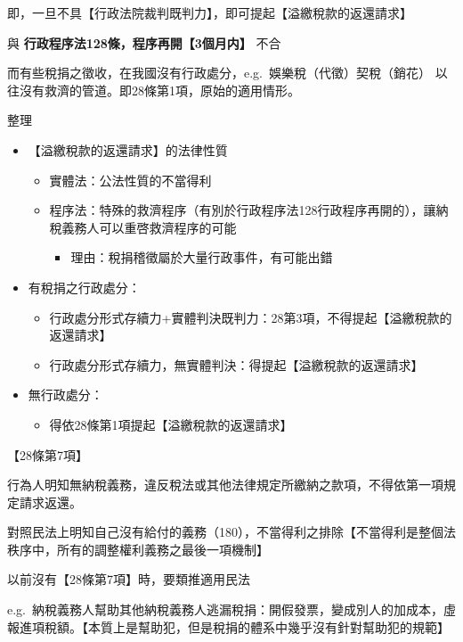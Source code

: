 \documentclass[]{ctexbook}
\providecommand{\tightlist}{%
  \setlength{\itemsep}{0pt}\setlength{\parskip}{0pt}}
\begin{document}
即，一旦不具【行政法院裁判既判力】，即可提起【溢繳稅款的返還請求】

與 \textbf{行政程序法128條，程序再開【3個月内】} 不合

而有些稅捐之徵收，在我國沒有行政處分，e.g.~娛樂稅（代徵）契稅（銷花）
以往沒有救濟的管道。即28條第1項，原始的適用情形。

整理

\begin{itemize}
\tightlist
\item
  【溢繳稅款的返還請求】的法律性質

  \begin{itemize}
  \tightlist
  \item
    實體法：公法性質的不當得利
  \item
    程序法：特殊的救濟程序（有別於行政程序法128行政程序再開的），讓納稅義務人可以重啓救濟程序的可能

    \begin{itemize}
    \tightlist
    \item
      理由：稅捐稽徵屬於大量行政事件，有可能出錯
    \end{itemize}
  \end{itemize}
\item
  有稅捐之行政處分：

  \begin{itemize}
  \tightlist
  \item
    行政處分形式存續力+實體判決既判力：28第3項，不得提起【溢繳稅款的返還請求】
  \item
    行政處分形式存續力，無實體判決：得提起【溢繳稅款的返還請求】
  \end{itemize}
\item
  無行政處分：

  \begin{itemize}
  \tightlist
  \item
    得依28條第1項提起【溢繳稅款的返還請求】
  \end{itemize}
\end{itemize}

【28條第7項】

行為人明知無納稅義務，違反稅法或其他法律規定所繳納之款項，不得依第一項規定請求返還。

對照民法上明知自己沒有給付的義務（180），不當得利之排除【不當得利是整個法秩序中，所有的調整權利義務之最後一項機制】

以前沒有【28條第7項】時，要類推適用民法

e.g.~納稅義務人幫助其他納稅義務人逃漏稅捐：開假發票，變成別人的加成本，虛報進項稅額。【本質上是幫助犯，但是稅捐的體系中幾乎沒有針對幫助犯的規範】
\end{document}
